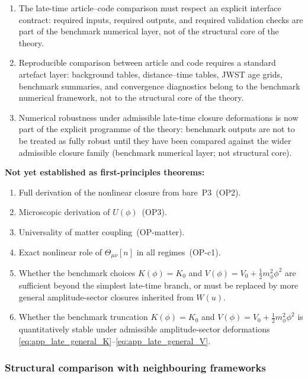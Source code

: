 \documentclass[11pt,a4paper]{article}
\numberwithin{equation}{section}
\begin{document}
\begin{enumerate}[label=(\roman*)]
    (structural/bridge-level distinction; coefficients remain Level~B).
  \item The late-time article--code comparison must respect an explicit
    interface contract: required inputs, required outputs, and required
    validation checks are part of the benchmark numerical layer, not of
    the structural core of the theory.
  \item Reproducible comparison between article and code requires a
    standard artefact layer: background tables, distance--time tables,
    JWST age grids, benchmark summaries, and convergence diagnostics
    belong to the benchmark numerical framework, not to the structural
    core of the theory.
  \item Numerical robustness under admissible late-time closure
    deformations is now part of the explicit programme of the theory:
    benchmark outputs are not to be treated as fully robust until they
    have been compared against the wider admissible closure family
    (benchmark numerical layer; not structural core).
\end{enumerate}

\textbf{Not yet established as first-principles theorems:}
\begin{enumerate}[label=(\roman*)]
  \item Full derivation of the nonlinear closure from bare~P3~(OP2).
  \item Microscopic derivation of $U(\phi)$~(OP3).
  \item Universality of matter coupling~(OP-matter).
  \item Exact nonlinear role of $\Theta_{\mu\nu}[n]$ in all
    regimes~(OP-c1).
  \item Whether the benchmark choices $K(\phi)=K_0$ and
    $V(\phi)=V_0+\tfrac12 m_\phi^2\phi^2$ are sufficient beyond the
    simplest late-time branch, or must be replaced by more general
    amplitude-sector closures inherited from $W(u)$.
  \item Whether the benchmark truncation
    $K(\phi)=K_0$ and
    $V(\phi)=V_0+\tfrac12 m_\phi^2\phi^2$
    is quantitatively stable under admissible amplitude-sector
    deformations
    \eqref{eq:app_late_general_K}--\eqref{eq:app_late_general_V}.
\end{enumerate}


\subsubsection*{Structural comparison with neighbouring frameworks}
\end{document}
